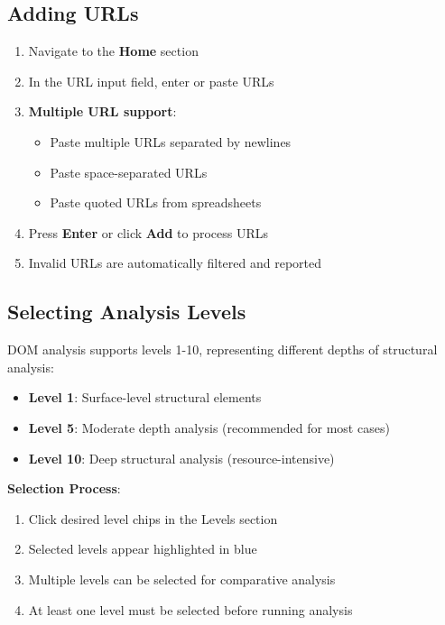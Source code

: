\subsection{Adding URLs}
\label{subsec:adding-urls}

\begin{enumerate}
    \item Navigate to the \textbf{Home} section
    \item In the URL input field, enter or paste URLs
    \item \textbf{Multiple URL support}:
        \begin{itemize}
            \item Paste multiple URLs separated by newlines
            \item Paste space-separated URLs
            \item Paste quoted URLs from spreadsheets
        \end{itemize}
    \item Press \textbf{Enter} or click \textbf{Add} to process URLs
    \item Invalid URLs are automatically filtered and reported
\end{enumerate}

\subsection{Selecting Analysis Levels}
\label{subsec:selecting-levels}

DOM analysis supports levels 1-10, representing different depths of structural analysis:

\begin{itemize}
    \item \textbf{Level 1}: Surface-level structural elements
    \item \textbf{Level 5}: Moderate depth analysis (recommended for most cases)
    \item \textbf{Level 10}: Deep structural analysis (resource-intensive)
\end{itemize}

\textbf{Selection Process}:
\begin{enumerate}
    \item Click desired level chips in the Levels section
    \item Selected levels appear highlighted in blue
    \item Multiple levels can be selected for comparative analysis
    \item At least one level must be selected before running analysis
\end{enumerate}

